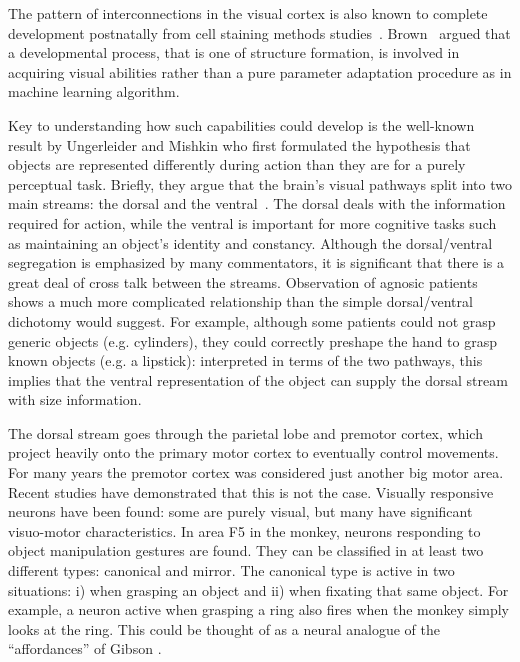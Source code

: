 \ifverbose
The pattern of interconnections in the visual cortex is also known
to complete development postnatally from cell staining methods
studies~\cite{burkhalter93development,callaway92development}.
Brown~\cite{brown94vision} argued that a developmental process, that
is one of structure formation, is involved in acquiring visual
abilities rather than a pure parameter adaptation procedure as in
machine learning algorithm.
\fi

Key to understanding how such capabilities could develop is the
well-known result by Ungerleider and Mishkin \cite{ungerleider82two}
who first formulated the hypothesis that objects are represented
differently during action than they are for a purely perceptual task.
Briefly, they argue that the brain's visual pathways split into two
main streams: the dorsal and the ventral~\cite{milner95visual}. The
dorsal deals with the information required for action, while the
ventral is important for more cognitive tasks such as maintaining an
object's identity and constancy.  Although the dorsal/ventral
segregation is emphasized by many commentators, it is significant that
there is a great deal of cross talk between the streams.  Observation
of agnosic patients \cite{jeannerod97cognitive} shows a much more
complicated relationship than the simple dorsal/ventral dichotomy
would suggest.  For example, although some patients could not grasp
generic objects (e.g.  cylinders), they could correctly preshape the
hand to grasp known objects (e.g. a lipstick): interpreted in terms of
the two pathways, this implies that the ventral representation of the
object can supply the dorsal stream with size information.

The dorsal stream goes through the parietal lobe and premotor cortex,
which project heavily onto the primary motor cortex to eventually
control movements. For many years the premotor cortex was considered
just another big motor area.  Recent studies
\cite{jeannerod97cognitive} have demonstrated that this is not the
case.  Visually responsive neurons have been found: some are purely
visual, but many have significant visuo-motor characteristics. In area
F5 in the monkey, neurons responding to object manipulation gestures
are found.  They can be classified in at least two different types:
canonical and mirror.  The canonical type is active in two situations:
i) when grasping an object and ii) when fixating that same object.
For example, a neuron active when grasping a ring also fires when the
monkey simply looks at the ring.  This could be thought of as a neural
analogue of the ``affordances'' of Gibson \cite{gibson77theory}. 

